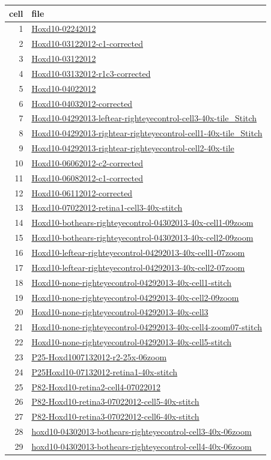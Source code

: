 \documentclass{article}
\renewenvironment{table}[1][ht]{\comment}{\endcomment}
\begin{document}
\begin{table}
  \centering
  \begin{tabular}{rl}
    \toprule
    cell & file \\
    \midrule
1& \url{Hoxd10-02242012} \\
2& \url{Hoxd10-03122012-c1-corrected} \\
3& \url{Hoxd10-03122012} \\
4& \url{Hoxd10-03132012-r1c3-corrected} \\
5& \url{Hoxd10-04022012} \\
6& \url{Hoxd10-04032012-corrected} \\
7& \url{Hoxd10-04292013-leftear-righteyecontrol-cell3-40x-tile_Stitch} \\
8&
\url{Hoxd10-04292013-rightear-righteyecontrol-cell1-40x-tile_Stitch} \\
9& \url{Hoxd10-04292013-rightear-righteyecontrol-cell2-40x-tile} \\
10& \url{Hoxd10-06062012-c2-corrected} \\
11& \url{Hoxd10-06082012-c1-corrected} \\
12& \url{Hoxd10-06112012-corrected} \\
13& \url{Hoxd10-07022012-retina1-cell3-40x-stitch} \\
14& \url{Hoxd10-bothears-righteyecontrol-04302013-40x-cell1-09zoom} \\
15& \url{Hoxd10-bothears-righteyecontrol-04302013-40x-cell2-09zoom} \\
16& \url{Hoxd10-leftear-righteyecontrol-04292013-40x-cell1-07zoom} \\
17& \url{Hoxd10-leftear-righteyecontrol-04292013-40x-cell2-07zoom} \\
18& \url{Hoxd10-none-righteyecontrol-04292013-40x-cell1-stitch} \\
19& \url{Hoxd10-none-righteyecontrol-04292013-40x-cell2-09zoom} \\
20& \url{Hoxd10-none-righteyecontrol-04292013-40x-cell3} \\
21& \url{Hoxd10-none-righteyecontrol-04292013-40x-cell4-zoom07-stitch} \\
22& \url{Hoxd10-none-righteyecontrol-04292013-40x-cell5-stitch} \\
23& \url{P25-Hoxd1007132012-r2-25x-06zoom} \\
24& \url{P25Hoxd10-07132012-retina1-40x-stitch} \\
25& \url{P82-Hoxd10-retina2-cell4-07022012} \\
26& \url{P82-Hoxd10-retina3-07022012-cell5-40x-stitch} \\
27& \url{P82-Hoxd10-retina3-07022012-cell6-40x-stitch} \\
28& \url{hoxd10-04302013-bothears-righteyecontrol-cell3-40x-06zoom} \\
29& \url{hoxd10-04302013-bothears-righteyecontrol-cell4-40x-06zoom} \\
\bottomrule
  \end{tabular}
  \caption{List of Hoxd10 file names in data set.}

\end{table}
\end{document}
